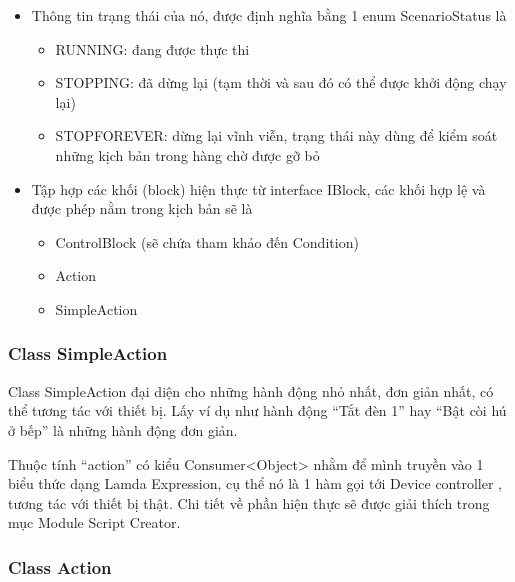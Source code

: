 \documentclass[12pt,a4paper,oneside]{extbook}
\begin{document}
\begin{itemize}[topsep=1mm,itemsep=-0.5mm]
\item Thông tin trạng thái của nó, được định nghĩa bằng 1 enum ScenarioStatus là

	\begin{itemize}[topsep=1mm,itemsep=-0.5mm]
	\item RUNNING: đang được thực thi
	\item STOPPING: đã dừng lại (tạm thời và sau đó có thể được khởi động chạy lại)
	\item STOP\textunderscore FOREVER: dừng lại vĩnh viễn, trạng thái này dùng để kiểm soát những kịch bản trong hàng chờ được gỡ bỏ
	\vspace{1mm}
	\end{itemize}

\item Tập hợp các khối (block) hiện thực từ interface IBlock, các khối hợp lệ và được phép nằm trong kịch bản sẽ là

	\begin{itemize}[topsep=1mm,itemsep=-0.5mm]
	\item ControlBlock (sẽ chứa tham khảo đến Condition)
	\item Action
	\item SimpleAction
	\vspace{1mm}
	\end{itemize}
	
\vspace{1mm}
\end{itemize}

\subsubsection{Class SimpleAction}

Class SimpleAction đại diện cho những hành động nhỏ nhất, đơn giản nhất, có thể tương tác với thiết bị. Lấy ví dụ như hành động “Tắt đèn 1” hay “Bật còi hú ở bếp” là những hành động đơn giản.

Thuộc tính “action” có kiểu Consumer<Object> nhằm để mình truyền vào 1 biểu thức dạng Lamda Expression, cụ thể nó là 1 hàm gọi tới Device controller , tương tác với thiết bị thật. Chi tiết về phần hiện thực sẽ được giải thích trong mục Module Script Creator.

\subsubsection{Class Action}
\end{document}
